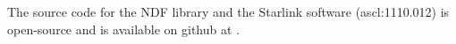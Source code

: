 \documentclass[final,authoryear,5p,times,twocolumn]{elsarticle}
\begin{document}
{The source code for the NDF library and the Starlink software
(ascl:1110.012) is open-source and is available on github at
.






}
\end{document}
